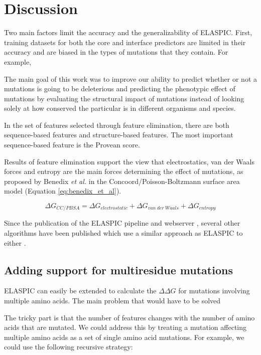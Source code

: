 
\chapter{Discussion} \label{ch:discussion}

Two main factors limit the accuracy and the generalizability of ELASPIC. First, training datasets for both the core and interface predictors are limited in their accuracy and are biased in the types of mutations that they contain. For example,


The main goal of this work was to improve our ability to predict whether or not a mutations is going to be deleterious and predicting the phenotypic effect of mutations by evaluating the structural impact of mutations instead of looking solely at how conserved the particular is in different organisms and species.

In the set of features selected through feature elimination, there are both sequence-based features and structure-based features. The most important sequence-based feature is the Provean score.

Results of feature elimination support the view that electrostatics, van der Waals forces and entropy are the main forces determining the effect of mutations, as proposed by Benedix \textit{et al.} in the Concoord/Poisson-Boltzmann surface area model (Equation \ref{eq:benedix_et_al}).

\begin{equation} \label{eq:benedix_et_al}
    \Delta G_{CC/PBSA} = \Delta G_{electrostatic} + \Delta G_{van\ der\ Waals} + \Delta G_{entropy}
\end{equation}

Since the publication of the ELASPIC pipeline \cite{berliner_combining_2014} and webserver \cite{witvliet_elaspic_2016}, several other algorithms have been published which use a similar approach as ELASPIC to either .



\section{Adding support for multiresidue mutations}

ELASPIC can easily be extended to calculate the $\Delta \Delta G$ for mutations involving multiple amino acids. The main problem that would have to be solved

The tricky part is that the number of features changes with the number of amino acids that are mutated. We could address this by treating a mutation affecting multiple amino acids as a set of single amino acid mutations. For example, we could use the following recursive strategy:

